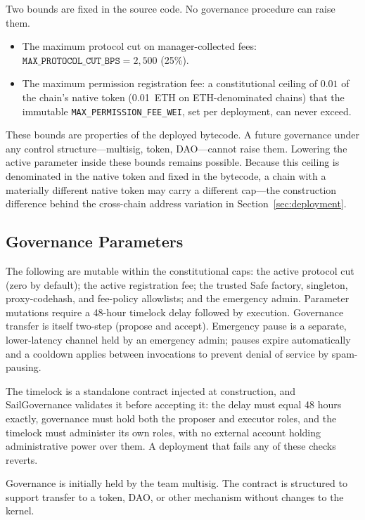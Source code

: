 \documentclass[11pt]{article}
\begin{document}
Two bounds are fixed in the source code. No governance procedure can raise them.
\begin{itemize}
  \itemsep0.1em
  \item The maximum protocol cut on manager-collected fees: $\texttt{MAX\_PROTOCOL\_CUT\_BPS} = 2{,}500$ (25\%).
  \item The maximum permission registration fee: a constitutional ceiling of $0.01$ of the chain's native token (0.01~ETH on ETH-denominated chains) that the immutable \texttt{MAX\_PERMISSION\_FEE\_WEI}, set per deployment, can never exceed.
\end{itemize}
These bounds are properties of the deployed bytecode. A future governance under any control structure---multisig, token, DAO---cannot raise them. Lowering the active parameter inside these bounds remains possible. Because this ceiling is denominated in the native token and fixed in the bytecode, a chain with a materially different native token may carry a different cap---the construction difference behind the cross-chain address variation in Section~\ref{sec:deployment}.

\subsection{Governance Parameters}

The following are mutable within the constitutional caps: the active protocol cut (zero by default); the active registration fee; the trusted Safe factory, singleton, proxy-codehash, and fee-policy allowlists; and the emergency admin. Parameter mutations require a 48-hour timelock delay followed by execution. Governance transfer is itself two-step (propose and accept). Emergency pause is a separate, lower-latency channel held by an emergency admin; pauses expire automatically and a cooldown applies between invocations to prevent denial of service by spam-pausing.

The timelock is a standalone contract injected at construction, and SailGovernance validates it before accepting it: the delay must equal 48 hours exactly, governance must hold both the proposer and executor roles, and the timelock must administer its own roles, with no external account holding administrative power over them. A deployment that fails any of these checks reverts.

Governance is initially held by the team multisig. The contract is structured to support transfer to a token, DAO, or other mechanism without changes to the kernel.
\end{document}
